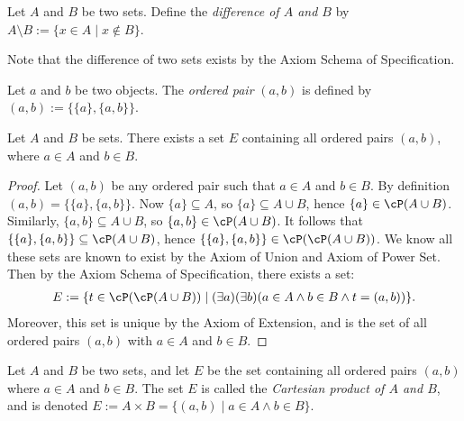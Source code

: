     \begin{definition}
        Let $A$ and $B$ be two sets. Define the \textit{difference of $A$ and $B$} by $A \setminus B := \{x \in A \mid x \not\in B\}$.
    \end{definition}

    Note that the difference of two sets exists by the Axiom Schema of Specification.

    \begin{definition}
        Let $a$ and $b$ be two objects. The \textit{ordered pair} $(a,b)$ is defined by $(a,b) := \{\{a\},\{a,b\}\}$.
    \end{definition}

    \begin{proposition}
        Let $A$ and $B$ be sets. There exists a set $E$ containing all ordered pairs $(a,b)$, where $a \in A$ and $b \in B$.
    \end{proposition}
        \begin{proof}
            Let $(a,b)$ be any ordered pair such that $a \in A$ and $b \in B$. By definition $(a,b) = \{\{a\},\{a,b\}\}$. Now $\{a\} \subseteq A$, so $\{a\} \subseteq A \cup B$, hence $\{a\} \in \cP(A \cup B)$. Similarly, $\{a,b\} \subseteq A \cup B$, so $\{a,b\} \in \cP(A \cup B)$. It follows that $\{\{a\},\{a,b\}\} \subseteq \cP(A \cup B)$, hence $\{\{a\},\{a,b\}\} \in \cP(\cP(A \cup B))$. We know all these sets are known to exist by the Axiom of Union and Axiom of Power Set. Then by the Axiom Schema of Specification, there exists a set:
                \begin{equation*}
                \begin{split}
                    E := \{t \in \cP(\cP(A \cup B)) \mid (\exists a)(\exists b)(a \in A \land b \in B \land t = (a,b))\}.
                \end{split}
                \end{equation*}
            Moreover, this set is unique by the Axiom of Extension, and is the set of all ordered pairs $(a,b)$ with $a \in A$ and $b \in B$.
        \end{proof}

    \begin{definition}
        Let $A$ and $B$ be two sets, and let $E$ be the set containing all ordered pairs $(a,b)$ where $a \in A$ and $b \in B$. The set $E$ is called the \textit{Cartesian product of $A$ and $B$}, and is denoted $E:= A \times B = \{(a,b) \mid a \in A \land b \in B\}$.
    \end{definition}

